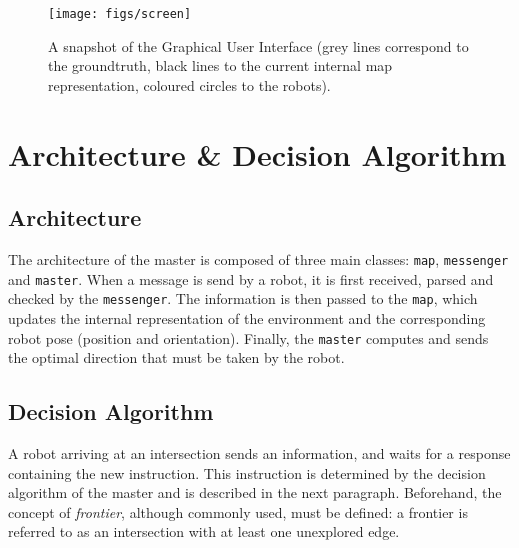 \documentclass[12pt]{report}
\begin{document}
\begin{figure}[!h]
\centering
\texttt{[image: figs/screen]}
\caption{A snapshot of the Graphical User Interface (grey lines correspond to the groundtruth, black lines to the current internal map representation, coloured circles to the robots).}
\label{fig:gui}
\end{figure}

\section{Architecture \& Decision Algorithm}
\subsection*{Architecture}
The architecture of the master is composed of three main classes: \texttt{map}, \texttt{messenger} and \texttt{master}. When a message is send by a robot, it is first received, parsed and checked by the \texttt{messenger}. The information is then passed to the \texttt{map}, which updates the internal representation of the environment and the corresponding robot pose (position and orientation). Finally, the \texttt{master} computes and sends the optimal direction that must be taken by the robot.

\subsection*{Decision Algorithm}
A robot arriving at an intersection sends an information, and waits for a response containing the new instruction. This instruction is determined by the decision algorithm of the master and is described in the next paragraph. Beforehand, the concept of \textit{frontier}, although commonly used, must be defined: a frontier is referred to as an intersection with at least one unexplored edge.
\end{document}
